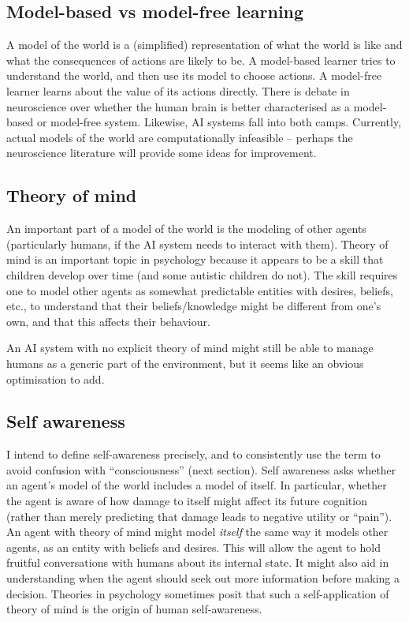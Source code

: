 \documentclass[10pt,a4paper]{article}
\newcommand{\nquote}[1]{``{#1}''}
\begin{document}
\subsection{Model-based vs model-free learning}
A model of the world is a (simplified) representation of what the world is like and what the consequences of actions are likely to be. A model-based learner tries to understand the world, and then use its model to choose actions. A model-free learner learns about the value of its actions directly. There is debate in neuroscience over whether the human brain is better characterised as a model-based or model-free system. Likewise, AI systems fall into both camps. Currently, actual models of the world are computationally infeasible -- perhaps the neuroscience literature will provide some ideas for improvement.

\subsection{Theory of mind}
An important part of a model of the world is the modeling of other agents (particularly humans, if the AI system needs to interact with them). Theory of mind is an important topic in psychology because it appears to be a skill that children develop over time (and some autistic children do not). The skill requires one to model other agents as somewhat predictable entities with desires, beliefs, etc., to understand that their beliefs/knowledge might be different from one's own, and that this affects their behaviour.

An AI system with no explicit theory of mind might still be able to manage humans as a generic part of the environment, but it seems like an obvious optimisation to add.

\subsection{Self awareness}
I intend to define self-awareness precisely, and to consistently use the term to avoid confusion with \nquote{consciousness} (next section). Self awareness asks whether an agent's model of the world includes a model of itself. In particular, whether the agent is aware of how damage to itself might affect its future cognition (rather than merely predicting that damage leads to negative utility or \nquote{pain}). An agent with theory of mind might model \emph{itself} the same way it models other agents, as an entity with beliefs and desires. This will allow the agent to hold fruitful conversations with humans about its internal state. It might also aid in understanding when the agent should seek out more information before making a decision. Theories in psychology sometimes posit that such a self-application of theory of mind is the origin of human self-awareness.
\end{document}
